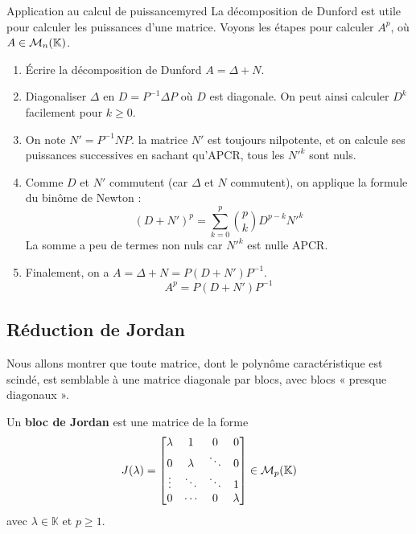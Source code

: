     \begin{omed}{Application au calcul de puissance}{myred}
        La décomposition de Dunford est utile pour calculer les puissances d’une matrice. Voyons les étapes pour calculer $A^p$, où $A \in \mathcal{M}_{n}(\mathbb{K})$.
        \begin{enumerate}
            \item Écrire la décomposition de Dunford $A = \Delta + N$.
            \item Diagonaliser $\Delta$ en $D = P^{-1} \Delta P$ où $D$ est diagonale. On peut ainsi calculer $D^k$ facilement pour $k \geq 0$.
            \item On note $N' = P^{-1} N P$. la matrice $N'$ est toujours nilpotente, et on calcule ses puissances successives en sachant qu’APCR, tous les $N'^k$ sont nuls.
            \item Comme $D$ et $N'$ commutent (car $\Delta$ et $N$ commutent), on applique la formule du binôme de Newton : 
            \[ (D + N')^p = \sum_{k=0}^{p} \binom{p}{k} D^{p-k} N'^k \]   
            La somme a peu de termes non nuls car $N'^k$ est nulle APCR.
            \item Finalement, on a $A = \Delta + N = P(D + N') P^{-1}$. 
            \[ A^p = P(D + N')P^{-1} \]   
        \end{enumerate}
    \end{omed}

\subsection{Réduction de Jordan}

    Nous allons montrer que toute matrice, dont le polynôme caractéristique est scindé, est semblable à une matrice diagonale par blocs, avec blocs « presque diagonaux ».

    \begin{defi}{}{}
        Un \textbf{bloc de Jordan} est une matrice de la forme 
        \[ J(\lambda) = \begin{bmatrix}
            \lambda & 1 & 0 & 0 \\
            0 & \lambda & \ddots & 0 \\
            \vdots & \ddots & \ddots & 1 \\
            0 & \cdots & 0 & \lambda
        \end{bmatrix} \in \mathcal{M}_{p}(\mathbb{K}) \]   
        avec $\lambda \in \mathbb{K}$ et $p \geq 1$. 
    \end{defi}

